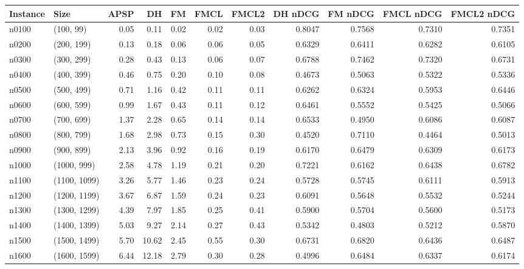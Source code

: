 \begin{tabular}{llrrrrrrrrr}
\toprule
Instance &         Size &  APSP &    DH &   FM &  FMCL &  FMCL2 &  DH nDCG &  FM nDCG &  FMCL nDCG &  FMCL2 nDCG \\
\midrule
   n0100 &    (100, 99) &  0.05 &  0.11 & 0.02 &  0.02 &   0.03 &   0.8047 &   0.7568 &     0.7310 &      0.7351 \\
   n0200 &   (200, 199) &  0.13 &  0.18 & 0.06 &  0.06 &   0.05 &   0.6329 &   0.6411 &     0.6282 &      0.6105 \\
   n0300 &   (300, 299) &  0.28 &  0.43 & 0.13 &  0.06 &   0.07 &   0.6788 &   0.7462 &     0.7320 &      0.6731 \\
   n0400 &   (400, 399) &  0.46 &  0.75 & 0.20 &  0.10 &   0.08 &   0.4673 &   0.5063 &     0.5322 &      0.5336 \\
   n0500 &   (500, 499) &  0.71 &  1.16 & 0.42 &  0.11 &   0.11 &   0.6262 &   0.6324 &     0.5953 &      0.6446 \\
   n0600 &   (600, 599) &  0.99 &  1.67 & 0.43 &  0.11 &   0.12 &   0.6461 &   0.5552 &     0.5425 &      0.5066 \\
   n0700 &   (700, 699) &  1.37 &  2.28 & 0.65 &  0.14 &   0.14 &   0.6533 &   0.4950 &     0.6086 &      0.6087 \\
   n0800 &   (800, 799) &  1.68 &  2.98 & 0.73 &  0.15 &   0.30 &   0.4520 &   0.7110 &     0.4464 &      0.5013 \\
   n0900 &   (900, 899) &  2.13 &  3.96 & 0.92 &  0.16 &   0.19 &   0.6170 &   0.6479 &     0.6309 &      0.6173 \\
   n1000 &  (1000, 999) &  2.58 &  4.78 & 1.19 &  0.21 &   0.20 &   0.7221 &   0.6162 &     0.6438 &      0.6782 \\
   n1100 & (1100, 1099) &  3.26 &  5.77 & 1.46 &  0.23 &   0.24 &   0.5728 &   0.5745 &     0.6111 &      0.5913 \\
   n1200 & (1200, 1199) &  3.67 &  6.87 & 1.59 &  0.24 &   0.23 &   0.6091 &   0.5648 &     0.5532 &      0.5244 \\
   n1300 & (1300, 1299) &  4.39 &  7.97 & 1.85 &  0.25 &   0.41 &   0.5900 &   0.5704 &     0.5600 &      0.5173 \\
   n1400 & (1400, 1399) &  5.03 &  9.27 & 2.14 &  0.27 &   0.43 &   0.5342 &   0.4803 &     0.5212 &      0.5870 \\
   n1500 & (1500, 1499) &  5.70 & 10.62 & 2.45 &  0.55 &   0.30 &   0.6731 &   0.6820 &     0.6436 &      0.6487 \\
   n1600 & (1600, 1599) &  6.44 & 12.18 & 2.79 &  0.30 &   0.28 &   0.4996 &   0.6484 &     0.6337 &      0.6174 \\

\end{tabular}
